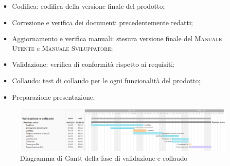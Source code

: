 \documentclass[../piano_di_progetto.tex]{subfiles}
\begin{document}
\begin{itemize}
    \item Codifica: codifica della versione finale del prodotto;
    \item Correzione e verifica dei documenti precedentemente redatti;
    \item Aggiornamento e verifica manuali: stesura versione finale del \textsc{Manuale Utente} e \textsc{Manuale Sviluppatore};
    \item Validazione: verifica di conformità rispetto ai requisiti;
    \item Collaudo: test di collaudo per le ogni funzionalità del prodotto;
    \item Preparazione presentazione.
\end{itemize}


\begin{figure}[H]
\centering
\includegraphics[width=18cm]{src/img/gantt/04_RA_alternative.png}
\caption{Diagramma di Gantt della fase di validazione e collaudo}
\end{figure}
\end{document}
